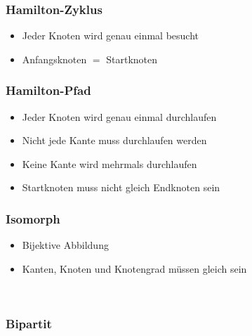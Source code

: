 \newpage

\begin{minipage}{0.5\textwidth}
\subsubsection*{Hamilton-Zyklus}
\begin{itemize}[leftmargin=*]
\item Jeder Knoten wird genau einmal besucht
\item Anfangsknoten $=$ Startknoten
\end{itemize}
\end{minipage}
\hfill
\begin{minipage}{0.5\textwidth}
\subsubsection*{Hamilton-Pfad}
\begin{itemize}[leftmargin=*]
\item Jeder Knoten wird genau einmal durchlaufen
\item Nicht jede Kante muss durchlaufen werden
\item Keine Kante wird mehrmals durchlaufen
\item Startknoten muss nicht gleich Endknoten sein
\end{itemize}
\end{minipage}

\subsubsection*{Isomorph}
\begin{itemize}[leftmargin=*]
\item Bijektive Abbildung
\item Kanten, Knoten und Knotengrad müssen gleich sein
\end{itemize}\

\subsubsection*{Bipartit}

